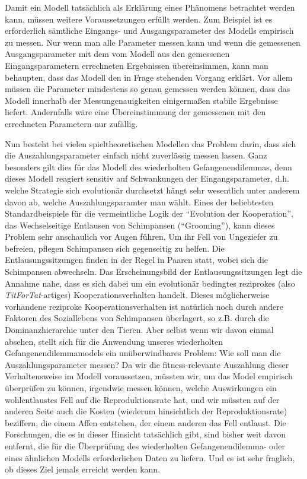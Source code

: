 Damit ein Modell tatsächlich als Erklärung eines Phänomens betrachtet werden
kann, müssen weitere Voraussetzungen erfüllt werden. Zum Beispiel ist es
erforderlich sämtliche Eingangs- und Ausgangsparameter des Modells
empirisch zu messen. Nur wenn man alle Parameter messen kann und wenn die
gemessenen Ausgangsparameter mit dem vom Modell aus den gemessenen 
Eingangsparametern errechneten Ergebnissen
übereinsimmen, kann man behaupten, dass das Modell den in Frage stehenden
Vorgang erklärt. Vor allem müssen die Parameter mindestens so genau
gemessen werden können, dass das Modell innerhalb der Messungenauigkeiten
einigermaßen stabile Ergebnisse liefert. Andernfalls wäre eine Übereinstimmung
der gemessenen mit den errechneten Parametern nur zufällig. 

Nun besteht bei vielen spieltheoretischen Modellen das Problem darin, dass sich
die Auszahlungsparameter einfach nicht zuverlässig messen lassen. Ganz
besonders gilt dies für das Modell des wiederholten Gefangenendilemmas, denn
dieses Modell reagiert sensitiv auf Schwankungen der Eingangsparameter, d.h.
welche Strategie sich evolutionär durchsetzt hängt sehr wesentlich unter
anderem davon ab, welche Auszahlungsparamter man wählt. Eines der beliebtesten
Standardbeispiele für die vermeintliche Logik der "`Evolution der
Kooperation"', das Wechselseitige Entlausen von Schimpansen ("`Grooming"'), kann
dieses Problem sehr anschaulich vor Augen führen. Um ihr Fell von Ungeziefer zu
befreien, pflegen Schimpansen sich gegenseitig zu helfen. Die
Entlausungssitzungen finden in der Regel in Paaren statt, wobei sich die
Schimpansen abwechseln. Das Erscheinungsbild der Entlausungssitzungen
legt die Annahme nahe, dass es sich dabei um ein evolutionär bedingtes
reziprokes (also {\em TitForTat}-artiges) Kooperationsverhalten handelt. Dieses
möglicherweise vorhandene reziproke Kooperationsverhalten ist natürlich noch
durch andere Faktoren des Soziallebens von Schimpansen überlagert, so z.B.
durch die Dominanzhierarchie unter den Tieren. Aber selbst wenn wir davon
einmal absehen, stellt sich für die Anwendung unseres wiederholten
Gefangenendilemmamodels ein unüberwindbares Problem: Wie soll man die
Auszahlungsparameter messen? Da wir die fitness-relevante Auszahlung dieser
Verhaltensweise im Modell voraussetzen, müssten wir, um das Model
empirisch überprüfen zu können, irgendwie messen können, welche Auswirkungen
ein wohlentlaustes Fell auf die Reproduktionsrate hat, und wir müssten
auf der anderen Seite auch die Kosten (wiederum hinsichtlich der
Reproduktionsrate) beziffern, die einem Affen entstehen, der einem anderen das
Fell entlaust. Die Forschungen, die es in dieser Hinsicht tatsächlich gibt,
sind bisher weit davon entfernt, die für die Überprüfung des wiederholten
Gefangenendilemma- oder eines ähnlichen Modells erforderlichen Daten zu
liefern. Und es ist sehr fraglich, ob dieses Ziel jemals erreicht werden kann.

